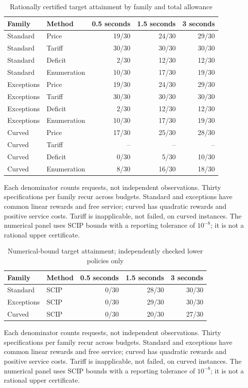 \begin{table}[p]\centering\caption{Rationally certified target attainment by family and total allowance}\label{tab:newrational60}
\begin{tabular}{llrrr}\toprule Family & Method & 0.5 seconds & 1.5 seconds & 3 seconds\\\midrule
Standard & Price & 19/30 & 24/30 & 29/30\\
Standard & Tariff & 30/30 & 30/30 & 30/30\\
Standard & Deficit & 2/30 & 12/30 & 12/30\\
Standard & Enumeration & 10/30 & 17/30 & 19/30\\
Exceptions & Price & 19/30 & 24/30 & 29/30\\
Exceptions & Tariff & 30/30 & 30/30 & 30/30\\
Exceptions & Deficit & 2/30 & 12/30 & 12/30\\
Exceptions & Enumeration & 10/30 & 17/30 & 19/30\\
Curved & Price & 17/30 & 25/30 & 28/30\\
Curved & Tariff & -- & -- & --\\
Curved & Deficit & 0/30 & 5/30 & 10/30\\
Curved & Enumeration & 8/30 & 16/30 & 18/30\\
\bottomrule\end{tabular}\par\smallskip\begin{minipage}{\textwidth}\small Each denominator counts requests, not independent observations. Thirty specifications per family recur across budgets. Standard and exceptions have common linear rewards and free service; curved has quadratic rewards and positive service costs. Tariff is inapplicable, not failed, on curved instances. The numerical panel uses SCIP bounds with a reporting tolerance of $10^{-8}$; it is not a rational upper certificate.\end{minipage}\end{table}
\begin{table}[p]\centering\caption{Numerical-bound target attainment; independently checked lower policies only}\label{tab:newnumerical60}
\begin{tabular}{llrrr}\toprule Family & Method & 0.5 seconds & 1.5 seconds & 3 seconds\\\midrule
Standard & SCIP & 0/30 & 28/30 & 30/30\\
Exceptions & SCIP & 0/30 & 29/30 & 30/30\\
Curved & SCIP & 0/30 & 20/30 & 27/30\\
\bottomrule\end{tabular}\par\smallskip\begin{minipage}{\textwidth}\small Each denominator counts requests, not independent observations. Thirty specifications per family recur across budgets. Standard and exceptions have common linear rewards and free service; curved has quadratic rewards and positive service costs. Tariff is inapplicable, not failed, on curved instances. The numerical panel uses SCIP bounds with a reporting tolerance of $10^{-8}$; it is not a rational upper certificate.\end{minipage}\end{table}
